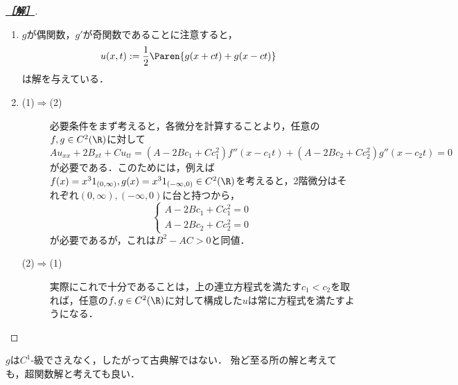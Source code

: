 \documentclass[uplatex,dvipdfmx]{jsarticle}
\begin{document}
\begin{proof}[\bf\underline{［解］}]\mbox{}
    \begin{enumerate}
        \item $g$が偶関数，$g'$が奇関数であることに注意すると，
        \[u(x,t):=\frac{1}{2}\Paren{g(x+ct)+g(x-ct)}\]
        は解を与えている．
        \item \begin{description}
            \item[(1)$\Rightarrow$(2)] 必要条件をまず考えると，各微分を計算することより，任意の$f,g\in C^2(\R)$に対して
            \[Au_{xx}+2B_{xt}+Cu_{tt}=(A-2Bc_1+Cc_1^2)f''(x-c_1t)+(A-2Bc_2+Cc_2^2)g''(x-c_2t)=0\]
            が必要である．このためには，例えば$f(x)=x^31_{(0,\infty)},g(x)=x^31_{(-\infty,0)}\in C^2(\R)$を考えると，2階微分はそれぞれ$(0,\infty),(-\infty,0)$に台と持つから，
            \[\begin{cases}
                A-2Bc_1+Cc_1^2=0\\
                A-2Bc_2+Cc_2^2=0
            \end{cases}\]
            が必要であるが，これは$B^2-AC>0$と同値．
            \item[(2)$\Rightarrow$(1)] 実際にこれで十分であることは，上の連立方程式を満たす$c_1<c_2$を取れば，任意の$f,g\in C^2(\R)$に対して構成した$u$は常に方程式を満たすようになる．
        \end{description}
    \end{enumerate}
\end{proof}
\begin{remarks*}
    $g$は$C^1$-級でさえなく，したがって古典解ではない．
    殆ど至る所の解と考えても，超関数解と考えても良い．
\end{remarks*}
\end{document}
